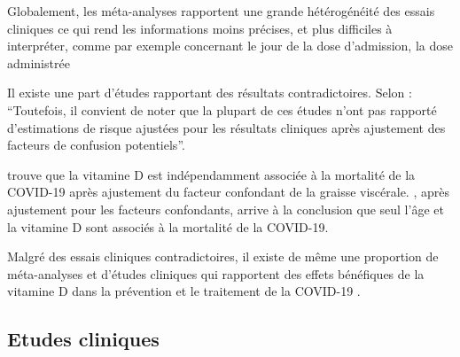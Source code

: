 \documentclass[
  a4paper,
  DIV=11,
  numbers=noendperiod,
  listof=totoc]{scrreprt}
\begin{document}
Globalement, les méta-analyses rapportent une grande hétérogénéité des
essais cliniques ce qui rend les informations moins précises, et plus
difficiles à interpréter, comme par exemple concernant le jour de la
dose d'admission, la dose administrée

Il existe une part d'études rapportant des résultats contradictoires.
Selon \textcite{Pal.2022}: ``Toutefois, il convient de noter que la
plupart de ces études n'ont pas rapporté d'estimations de risque
ajustées pour les résultats cliniques après ajustement des facteurs de
confusion potentiels''.

\textcite{Vanegas-Cedillo.2022} trouve que la vitamine D est
indépendamment associée à la mortalité de la COVID-19 après ajustement
du facteur confondant de la graisse viscérale. \textcite{Borsche.2021},
après ajustement pour les facteurs confondants, arrive à la conclusion
que seul l'âge et la vitamine D sont associés à la mortalité de la
COVID-19.

Malgré des essais cliniques contradictoires, il existe de même une
proportion de méta-analyses et d'études cliniques qui rapportent des
effets bénéfiques de la vitamine D dans la prévention et le traitement
de la COVID-19 \autocite{Pal.2022}.

\subsection{Etudes cliniques}\label{etudes-cliniques}
\end{document}
